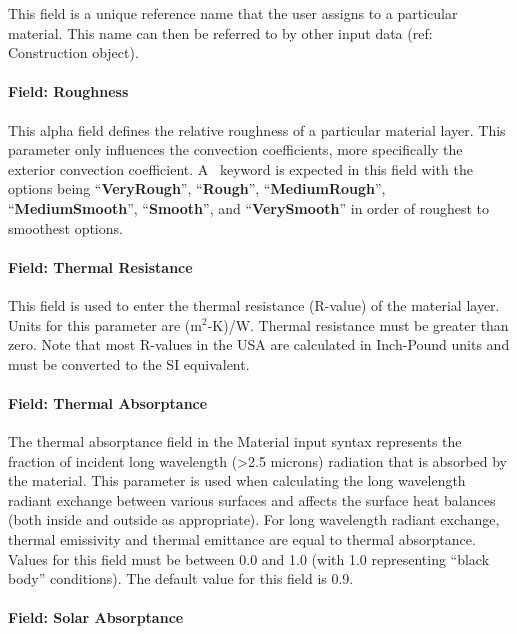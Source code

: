 This field is a unique reference name that the user assigns to a particular material. This name can then be referred to by other input data (ref: Construction object).

\paragraph{Field: Roughness}\label{field-roughness-1}

This alpha field defines the relative roughness of a particular material layer. This parameter only influences the convection coefficients, more specifically the exterior convection coefficient. A~ keyword is expected in this field with the options being ``\textbf{VeryRough}'', ``\textbf{Rough}'', ``\textbf{MediumRough}'', ``\textbf{MediumSmooth}'', ``\textbf{Smooth}'', and ``\textbf{VerySmooth}'' in order of roughest to smoothest options.

\paragraph{Field: Thermal Resistance}\label{field-thermal-resistance}

This field is used to enter the thermal resistance (R-value) of the material layer. Units for this parameter are (m\(^{2}\)-K)/W. Thermal resistance must be greater than zero. Note that most R-values in the USA are calculated in Inch-Pound units and must be converted to the SI equivalent.

\paragraph{Field: Thermal Absorptance}\label{field-thermal-absorptance-1}

The thermal absorptance field in the Material input syntax represents the fraction of incident long wavelength (>2.5 microns) radiation that is absorbed by the material. This parameter is used when calculating the long wavelength radiant exchange between various surfaces and affects the surface heat balances (both inside and outside as appropriate). For long wavelength radiant exchange, thermal emissivity and thermal emittance are equal to thermal absorptance. Values for this field must be between 0.0 and 1.0 (with 1.0 representing ``black body'' conditions). The default value for this field is 0.9.

\paragraph{Field: Solar Absorptance}\label{field-solar-absorptance-1}

